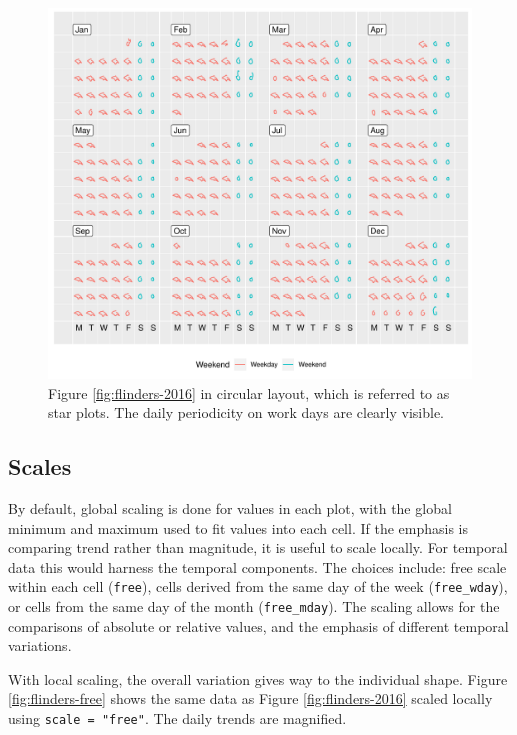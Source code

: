 \documentclass[12pt]{article}
\begin{document}
\begin{figure}

{\centering \includegraphics[width=\textwidth]{figure/flinders-polar-1} 

}

\caption{Figure \ref{fig:flinders-2016} in circular layout, which is referred to as star plots. The daily periodicity on work days are clearly visible.}\label{fig:flinders-polar}
\end{figure}

\hypertarget{scales}{%
\subsection{Scales}\label{scales}}

By default, global scaling is done for values in each plot, with the
global minimum and maximum used to fit values into each cell. If the
emphasis is comparing trend rather than magnitude, it is useful to scale
locally. For temporal data this would harness the temporal components.
The choices include: free scale within each cell (\texttt{free}), cells
derived from the same day of the week (\texttt{free\_wday}), or cells
from the same day of the month (\texttt{free\_mday}). The scaling allows
for the comparisons of absolute or relative values, and the emphasis of
different temporal variations.

With local scaling, the overall variation gives way to the individual
shape. Figure \ref{fig:flinders-free} shows the same data as Figure
\ref{fig:flinders-2016} scaled locally using \texttt{scale\ =\ "free"}.
The daily trends are magnified.
\end{document}

